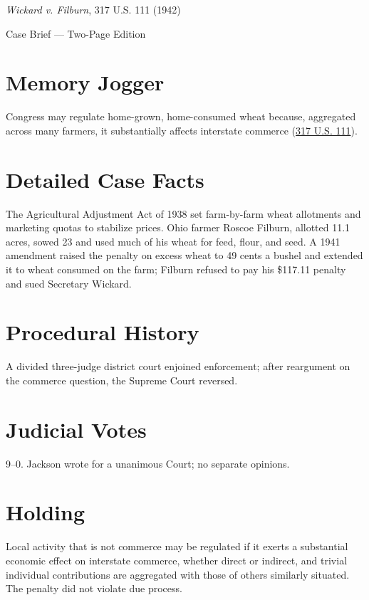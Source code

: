 \documentclass[12pt]{article}
\begin{document}
\begin{center}
{\LARGE \textit{Wickard v. Filburn}, 317 U.S. 111 (1942)\par}
\vspace{0.5em}
{\large Case Brief --- Two-Page Edition\par}
\end{center}

\section{Memory Jogger}
Congress may regulate home-grown, home-consumed wheat because, aggregated across many farmers, it substantially affects interstate commerce (\href{https://supreme.justia.com/cases/federal/us/317/111/}{317 U.S. 111}).

\section{Detailed Case Facts}
The Agricultural Adjustment Act of 1938 set farm-by-farm wheat allotments and marketing quotas to stabilize prices. Ohio farmer Roscoe Filburn, allotted 11.1 acres, sowed 23 and used much of his wheat for feed, flour, and seed. A 1941 amendment raised the penalty on excess wheat to 49 cents a bushel and extended it to wheat consumed on the farm; Filburn refused to pay his \$117.11 penalty and sued Secretary Wickard.

\section{Procedural History}
A divided three-judge district court enjoined enforcement; after reargument on the commerce question, the Supreme Court reversed.

\section{Judicial Votes}
9--0. Jackson wrote for a unanimous Court; no separate opinions.

\section{Holding}
Local activity that is not commerce may be regulated if it exerts a substantial economic effect on interstate commerce, whether direct or indirect, and trivial individual contributions are aggregated with those of others similarly situated. The penalty did not violate due process.
\end{document}
